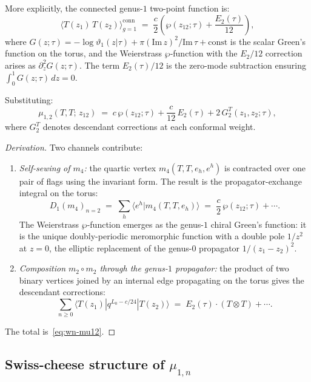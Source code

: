 \documentclass[11pt]{article}
\begin{document}
More explicitly, the connected genus-$1$ two-point function is:
\begin{equation}\label{eq:wn-mu12-explicit}
\langle T(z_1)\,T(z_2) \rangle_{g=1}^{\mathrm{conn}}
\;=\;
\frac{c}{2}\left(\wp(z_{12};\tau) + \frac{E_2(\tau)}{12}\right),
\end{equation}
where $G(z;\tau) = -\log\vartheta_1(z|\tau)
+ \pi(\mathrm{Im}\,z)^2/\mathrm{Im}\,\tau + \mathrm{const}$
is the scalar Green's function on the torus, and the Weierstrass
$\wp$-function with the $E_2/12$ correction arises as
$\partial_z^2 G(z;\tau)$.  The term $E_2(\tau)/12$ is the
zero-mode subtraction ensuring $\int_0^1 G(z;\tau)\,dz = 0$.

Substituting:
\begin{equation}\label{eq:wn-mu12-full}
\mu_{1,2}(T,T;\,z_{12})
\;=\;
c\,\wp(z_{12};\tau) + \frac{c}{12}\,E_2(\tau)
+ 2\,G_2^T(z_1,z_2;\tau),
\end{equation}
where $G_2^T$ denotes descendant corrections at each conformal weight.

\begin{proof}[Derivation]
Two channels contribute:
\begin{enumerate}[label=\textup{(\roman*)}]
\item \emph{Self-sewing of $m_4$:} the quartic vertex $m_4(T,T,e_h,e^h)$
  is contracted over one pair of flags using the invariant form.  The
  result is the propagator-exchange integral on the torus:
  \[
  D_1(m_4)_{n=2}
  \;=\;
  \sum_h \langle e^h | m_4(T,T,e_h) \rangle
  \;=\;
  \frac{c}{2}\,\wp(z_{12};\tau) + \cdots.
  \]
  The Weierstrass $\wp$-function emerges as the genus-$1$ chiral Green's
  function: it is the unique doubly-periodic meromorphic function with
  a double pole $1/z^2$ at $z = 0$, the elliptic replacement of the
  genus-$0$ propagator $1/(z_1-z_2)^2$.

\item \emph{Composition $m_2 \circ m_2$ through the genus-$1$ propagator:}
  the product of two binary vertices joined by an internal edge
  propagating on the torus gives the descendant corrections:
  \[
  \sum_{n \geq 0} \langle T(z_1) | q^{L_0 - c/24} | T(z_2) \rangle
  \;=\;
  E_2(\tau)\cdot(T \otimes T) + \cdots.
  \]
\end{enumerate}
The total is~\eqref{eq:wn-mu12}.
\end{proof}

\subsection{Swiss-cheese structure of $\mu_{1,n}$}
\end{document}
